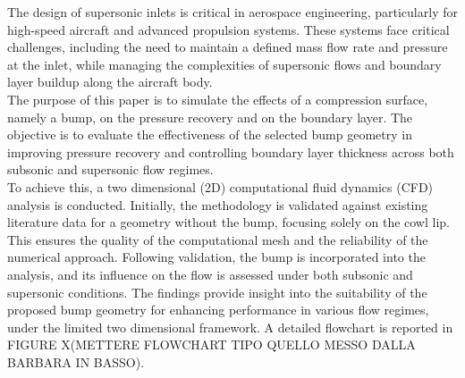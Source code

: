 \documentclass[11pt,a4paper]{article}
\begin{document}

The design of supersonic inlets is critical in aerospace engineering, particularly for high-speed aircraft and advanced propulsion systems. These systems face critical challenges, including the need to maintain a defined mass flow rate and pressure at the inlet, while managing the complexities of supersonic flows and boundary layer buildup along the aircraft body. \\
The purpose of this paper is to simulate the effects of a compression surface, namely a bump, on the pressure recovery and on the boundary layer. The objective is to evaluate the effectiveness of the selected bump geometry in improving pressure recovery and controlling boundary layer thickness across both subsonic and supersonic flow regimes.\\
To achieve this, a two dimensional (2D) computational fluid dynamics (CFD) analysis is conducted. Initially, the methodology is validated against existing literature data for a geometry without the bump, focusing solely on the cowl lip. This ensures the quality of the computational mesh and the reliability of the numerical approach. Following validation, the bump is incorporated into the analysis, and its influence on the flow is assessed under both subsonic and supersonic conditions. The findings provide insight into the suitability of the proposed bump geometry for enhancing performance in various flow regimes, under the limited two dimensional framework.
A detailed flowchart is reported in FIGURE X(METTERE FLOWCHART TIPO QUELLO MESSO DALLA BARBARA IN BASSO).

\end{document}
